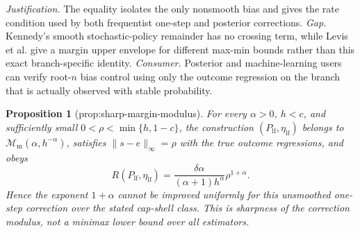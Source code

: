 \documentclass{article}
\newtheorem{proposition}{Proposition}
\begin{document}
\par\smallskip\noindent \textit{Justification.} The equality isolates the only nonsmooth bias and gives the rate condition used by both frequentist one-step and posterior corrections. \textit{Gap.} Kennedy's smooth stochastic-policy remainder has no crossing term, while Levis et al. give a margin upper envelope for different max-min bounds rather than this exact branch-specific identity. \textit{Consumer.} Posterior and machine-learning users can verify root-\(n\) bias control using only the outcome regression on the branch that is actually observed with stable probability.

\begin{proposition}[prop:sharp-margin-modulus]\label{prop:sharp-margin-modulus}
For every \(\alpha>0\), \(h<c\), and sufficiently small \(0<\rho<\min\{h,1-c\}\), the construction \((P_{\mathrm{lf}},\eta_{\mathrm{lf}})\) belongs to \(\mathcal M_{\mathrm m}(\alpha,h^{-\alpha})\), satisfies \(\|s-e\|_\infty=\rho\) with the true outcome regressions, and obeys \[R(P_{\mathrm{lf}},\eta_{\mathrm{lf}})=\frac{\delta\alpha}{(\alpha+1)h^\alpha}\rho^{1+\alpha}.\] Hence the exponent \(1+\alpha\) cannot be improved uniformly for this unsmoothed one-step correction over the stated cap-shell class. This is sharpness of the correction modulus, not a minimax lower bound over all estimators.
\end{proposition}
\end{document}

